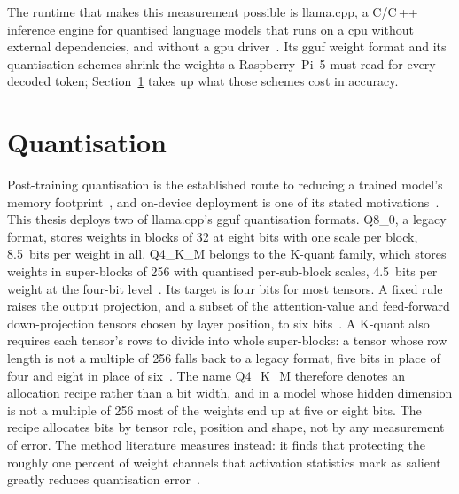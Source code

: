 The runtime that makes this measurement possible is llama.cpp, a C/C\,++
inference engine for quantised language models that runs on a \gls{cpu} without external
dependencies, and without a \gls{gpu} driver~\cite{llamacpp}. Its \gls{gguf}
weight format and its quantisation schemes shrink the weights a Raspberry~Pi~5 must read for every
decoded token; Section~\ref{sec:quantisation} takes up what those schemes cost in accuracy.

\section{Quantisation}
\label{sec:quantisation}
Post-training quantisation is the established route to reducing a trained model's memory
footprint~\cite{gptq}, and on-device deployment is one of its stated motivations~\cite{awq}.
This thesis deploys two of llama.cpp's \gls{gguf} quantisation formats. Q8\_0, a legacy format,
stores weights in blocks of 32 at eight bits with one scale per block, 8.5~bits per weight in
all. Q4\_K\_M belongs to the K-quant family, which stores weights in super-blocks of 256 with
quantised per-sub-block scales, 4.5~bits per weight at the four-bit level~\cite{llamacpp}. Its
target is four bits for most tensors. A fixed rule raises the output projection, and a subset of
the attention-value and feed-forward down-projection tensors chosen by layer position, to six
bits~\cite{llamacpp}. A K-quant also requires each tensor's rows to divide into whole
super-blocks: a tensor whose row length is not a multiple of 256 falls back to a legacy format,
five bits in place of four and eight in place of six~\cite{llamacpp}. The name Q4\_K\_M therefore
denotes an allocation recipe rather than a bit width, and in a model whose hidden dimension is not
a multiple of 256 most of the weights end up at five or eight bits. The recipe allocates bits by
tensor role, position and shape, not by any measurement of error. The method literature measures
instead: it finds that protecting the roughly one percent of weight channels that activation
statistics mark as salient greatly reduces quantisation error~\cite{awq}.

